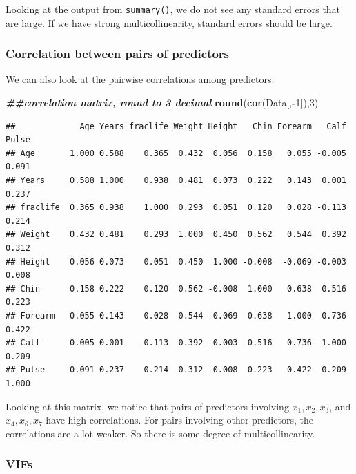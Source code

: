 \documentclass[
]{book}
\newenvironment{Shaded}{\begin{snugshade}}{\end{snugshade}}
\newcommand{\DecValTok}[1]{\textcolor[rgb]{0.00,0.00,0.81}{#1}}
\newcommand{\DocumentationTok}[1]{\textcolor[rgb]{0.56,0.35,0.01}{\textbf{\textit{#1}}}}
\newcommand{\FunctionTok}[1]{\textcolor[rgb]{0.13,0.29,0.53}{\textbf{#1}}}
\newcommand{\NormalTok}[1]{#1}
\newcommand{\SpecialCharTok}[1]{\textcolor[rgb]{0.81,0.36,0.00}{\textbf{#1}}}
\begin{document}
Looking at the output from \texttt{summary()}, we do not see any standard errors that are large. If we have strong multicollinearity, standard errors should be large.

\hypertarget{correlation-between-pairs-of-predictors}{%
\subsubsection*{Correlation between pairs of predictors}\label{correlation-between-pairs-of-predictors}}

We can also look at the pairwise correlations among predictors:

\begin{Shaded}
\begin{Highlighting}[]
\DocumentationTok{\#\#correlation matrix, round to 3 decimal}
\FunctionTok{round}\NormalTok{(}\FunctionTok{cor}\NormalTok{(Data[,}\SpecialCharTok{{-}}\DecValTok{1}\NormalTok{]),}\DecValTok{3}\NormalTok{)}
\end{Highlighting}
\end{Shaded}

\begin{verbatim}
##             Age Years fraclife Weight Height   Chin Forearm   Calf Pulse
## Age       1.000 0.588    0.365  0.432  0.056  0.158   0.055 -0.005 0.091
## Years     0.588 1.000    0.938  0.481  0.073  0.222   0.143  0.001 0.237
## fraclife  0.365 0.938    1.000  0.293  0.051  0.120   0.028 -0.113 0.214
## Weight    0.432 0.481    0.293  1.000  0.450  0.562   0.544  0.392 0.312
## Height    0.056 0.073    0.051  0.450  1.000 -0.008  -0.069 -0.003 0.008
## Chin      0.158 0.222    0.120  0.562 -0.008  1.000   0.638  0.516 0.223
## Forearm   0.055 0.143    0.028  0.544 -0.069  0.638   1.000  0.736 0.422
## Calf     -0.005 0.001   -0.113  0.392 -0.003  0.516   0.736  1.000 0.209
## Pulse     0.091 0.237    0.214  0.312  0.008  0.223   0.422  0.209 1.000
\end{verbatim}

Looking at this matrix, we notice that pairs of predictors involving \(x_1, x_2, x_3\), and \(x_4, x_6, x_7\) have high correlations. For pairs involving other predictors, the correlations are a lot weaker. So there is some degree of multicollinearity.

\hypertarget{vifs}{%
\subsubsection*{VIFs}\label{vifs}}
\end{document}
